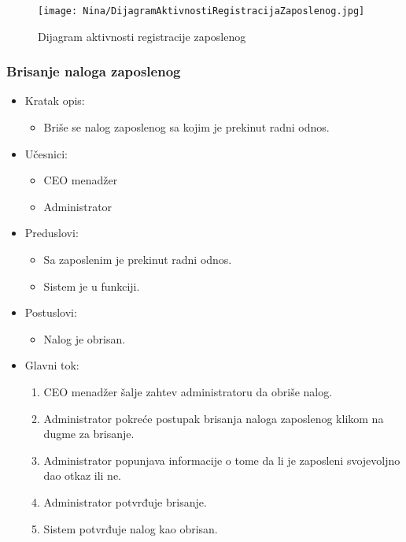 \documentclass[a4paper]{article}
\begin{document}
\begin{figure}[H]
    \centering
    \texttt{[image: Nina/DijagramAktivnostiRegistracijaZaposlenog.jpg]}
    \caption{Dijagram aktivnosti registracije zaposlenog}
    \label{fig:RegistracijaZ}
\end{figure}


\subsubsection{Brisanje naloga zaposlenog}

\begin{itemize}
    \item Kratak opis: 
    \begin{itemize}
        \item Briše se nalog zaposlenog sa kojim je prekinut radni odnos.
    \end{itemize}
    \item Učesnici:
        \begin{itemize}
        \item CEO menadžer
        \item Administrator
    \end{itemize}
    \item Preduslovi:
        \begin{itemize}
            \item Sa zaposlenim je prekinut radni odnos.
            \item Sistem je u funkciji.
        \end{itemize}
    \item Postuslovi:
        \begin{itemize}
            \item Nalog je obrisan.
        \end{itemize}
    \item Glavni tok:
        \begin{enumerate}
            \item CEO menadžer šalje zahtev administratoru da obriše nalog.
            \item Administrator pokreće postupak brisanja naloga zaposlenog klikom na dugme za brisanje.
            \item Administrator popunjava informacije o tome da li je zaposleni svojevoljno dao otkaz ili ne.
            \item Administrator potvrđuje brisanje.
            \item Sistem potvrđuje nalog kao obrisan.
        \end{enumerate}
\end{itemize}
\end{document}
